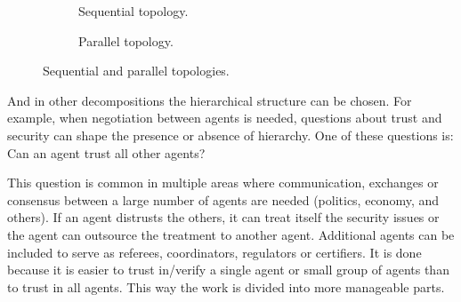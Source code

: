 \documentclass[../main.tex]{subfiles}
\begin{document}
\begin{figure}[h]
\begin{subfigure}[b]{.45\textwidth}
  \centering
  \caption{Sequential topology.}\label{fig:sequential_topology}
\end{subfigure}
\hfill
\begin{subfigure}[b]{.45\textwidth}
  \centering
  \caption{Parallel topology.}\label{fig:parallel_topology}
\end{subfigure}
\caption{Sequential and parallel topologies.}\label{fig:sequential_parallel_topology}
\end{figure}

And in other decompositions the hierarchical structure can be chosen.
For example, when negotiation between agents is needed, questions about trust and security can shape the presence or absence of hierarchy.
One of these questions is: Can an agent trust all other agents?

This question is common in multiple areas where communication, exchanges or consensus between a large number of agents are needed (politics, economy, and others).
If an agent distrusts the others, it can treat itself the security issues or the agent can outsource the treatment to another agent.
Additional agents can be included to serve as referees, coordinators, regulators or certifiers. It is done because it is easier to trust in/verify a single agent or small group of agents than to trust in all agents. This way the work is divided into more manageable parts.
\end{document}
